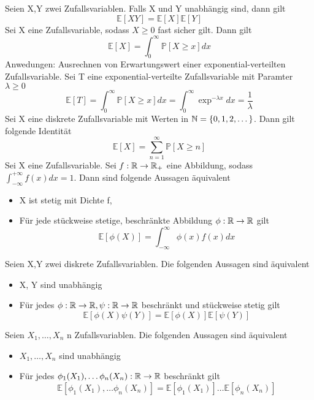 \Theo[4.13] Seien X,Y zwei Zufallsvariablen. Falls X und Y unabhängig sind, dann gilt \[ \mathbb{E}[XY] = \mathbb{E}[X]\mathbb{E}[Y]\]
 \newline
Sei X eine Zufallsvariable, sodass \( X \geq 0 \) fast sicher gilt. Dann gilt \[ \mathbb{E}[X] = \int_0^{\infty} \mathbb{P}[X \geq x]dx\]
\Bem[4.14A]
Anwedungen: Ausrechnen von Erwartungswert einer exponential-verteilten Zufallsvariable. Sei T eine exponential-verteilte Zufallsvariable mit Paramter \(\lambda \geq 0\) \[ \mathbb{E}[T] = \int_0^\infty \mathbb{P}[X \geq x]dx = \int_0^\infty \exp^{-\lambda x }dx = \frac{1}{\lambda}\]
 \newline
Sei X eine diskrete Zufallsvariable mit Werten in \( \mathbb{N} = \{0, 1, 2, \dots \}\). Dann gilt folgende Identität \[ \mathbb{E}[X] = \sum_{n=1}^{\infty} \mathbb{P}[X \geq n]\]
\Satz[4.16] \newline
Sei X eine Zufallsvariable. Sei \( f: \mathbb{R} \rightarrow \mathbb{R}_+ \) eine Abbildung, sodass \( \int_{-\infty}^{+ \infty} f(x)dx = 1\). Dann sind folgende Aussagen äquivalent
\begin{itemize}
    \item X ist stetig mit Dichte f,
    \item Für jede stückweise stetige, beschränkte Abbildung \(\phi: \mathbb{R} \rightarrow \mathbb{R} \) gilt \[ \mathbb{E}[\phi(X)] = \int_{-\infty}^{\infty}\phi (x) f(x)dx\]
\end{itemize}
\Theo[4.17] \newline
Seien X,Y zwei diskrete Zufallsvariablen. Die folgenden Aussagen sind äquivalent
\begin{itemize}
    \item X, Y sind unabhängig
    \item Für jedes \( \phi : \mathbb{R} \rightarrow \mathbb{R}, \psi : \mathbb{R} \rightarrow \mathbb{R} \) beschränkt und stückweise stetig gilt \[ \mathbb{E}[\phi(X)\psi(Y)] = \mathbb{E}[\phi(X)]\mathbb{E}[\psi(Y)]\]
\end{itemize}
\Theo[4.18] \newline
Seien \(X_1, \dots , X_n \) n Zufallsvariablen. Die folgenden Aussagen sind äquivalent
\begin{itemize}
    \item \(X_1, \dots , X_n \) sind unabhängig
    \item Für jedes \( \phi_1 (X_1), \dots \phi_n(X_n ) : \mathbb{R} \rightarrow \mathbb{R} \) beschränkt gilt \[\mathbb{E}[\phi_1(X_1), \dots \phi_n(X_n)] = \mathbb{E}[\phi_1(X_1)] \dots \mathbb{E}[\phi_n(X_n)]\]
\end{itemize}
